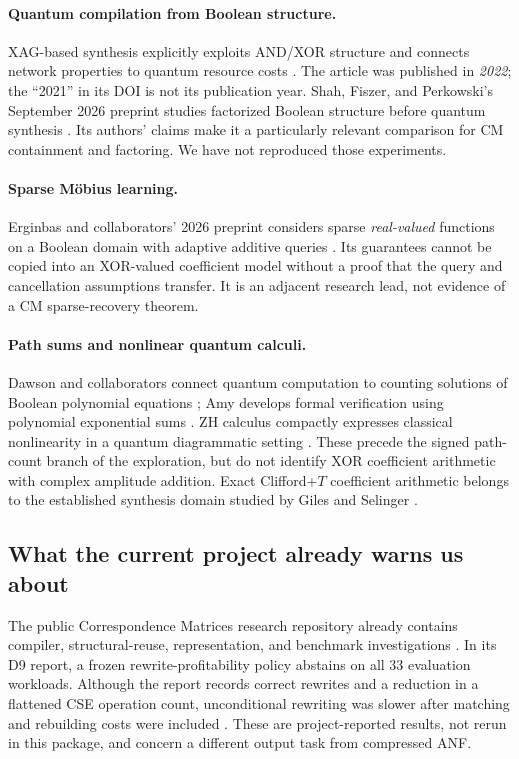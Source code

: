 \documentclass[11pt,a4paper]{article}
\theoremstyle{definition}\newtheorem{definition}[theorem]{Definition}
\theoremstyle{remark}\newtheorem{remark}[theorem]{Remark}
\numberwithin{equation}{section}
\begin{document}
\paragraph{Quantum compilation from Boolean structure.}
XAG-based synthesis explicitly exploits AND/XOR structure and connects network properties to quantum resource costs \cite{xag}. The article was published in \emph{2022}; the ``2021'' in its DOI is not its publication year. Shah, Fiszer, and Perkowski's September 2026 preprint studies factorized Boolean structure before quantum synthesis \cite{factorized}. Its authors' claims make it a particularly relevant comparison for CM containment and factoring. We have not reproduced those experiments.

\paragraph{Sparse M\"obius learning.}
Erginbas and collaborators' 2026 preprint considers sparse \emph{real-valued} functions on a Boolean domain with adaptive additive queries \cite{sparse2026}. Its guarantees cannot be copied into an XOR-valued coefficient model without a proof that the query and cancellation assumptions transfer. It is an adjacent research lead, not evidence of a CM sparse-recovery theorem.

\paragraph{Path sums and nonlinear quantum calculi.}
Dawson and collaborators connect quantum computation to counting solutions of Boolean polynomial equations \cite{dawson}; Amy develops formal verification using polynomial exponential sums \cite{amy}. ZH calculus compactly expresses classical nonlinearity in a quantum diagrammatic setting \cite{zh}. These precede the signed path-count branch of the exploration, but do not identify XOR coefficient arithmetic with complex amplitude addition. Exact Clifford+$T$ coefficient arithmetic belongs to the established synthesis domain studied by Giles and Selinger \cite{giles}.

\subsection{What the current project already warns us about}
The public Correspondence Matrices research repository already contains compiler, structural-reuse, representation, and benchmark investigations \cite{repo}. In its D9 report, a frozen rewrite-profitability policy abstains on all 33 evaluation workloads. Although the report records correct rewrites and a reduction in a flattened CSE operation count, unconditional rewriting was slower after matching and rebuilding costs were included \cite{d9}. These are project-reported results, not rerun in this package, and concern a different output task from compressed ANF.
\end{document}
